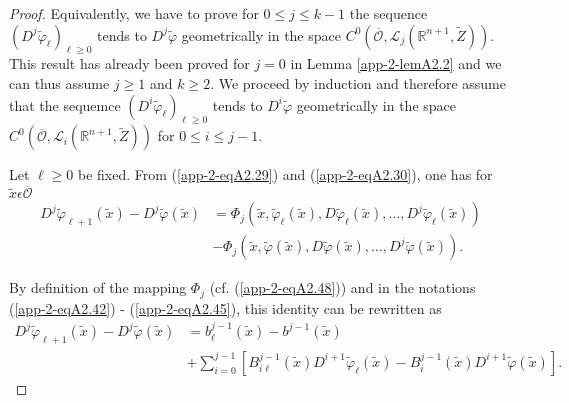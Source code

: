 \begin{proof}
Equivalently, we have to prove for $0 \leq j \leq k-1$ the sequence
$(D^{j}\widetilde{\varphi}_{\ell})_{\ell \geq 0}$ tends to
$D^{j}\widetilde{\varphi}$ geometrically in the space
$C^{0}(\overline{\mathscr{O}}, \mathscr{L}_{j}(\mathbb{R}^{n+1},
\widetilde{Z}))$. This result has already been proved for $j = 0$ in
Lemma \ref{app-2-lemA2.2} and we can thus assume $j \geq 1$ and $k \geq 2$. We
proceed by induction and therefore assume that the sequemce
$(D^{i}\widetilde{\varphi}_{\ell})_{\ell \geq 0}$ tends to
$D^{i}\widetilde{\varphi}$ geometrically in the space
$C^{0}(\overline{\mathscr{O}}, \mathscr{L}_{i}(\mathbb{R}^{n+1},
\widetilde{Z}))$ for $0 \leq i \leq j-1$.

Let $\ell \geq 0$ be fixed. From (\ref{app-2-eqA2.29}) and (\ref{app-2-eqA2.30}), one has for
$\widetilde{x} \epsilon \overline{\mathscr{O}}$
\begin{align*}
D^{j}\widetilde{\varphi}_{\ell + 1}(\widetilde{x}) -
D^{j}\widetilde{\varphi}(\widetilde{x}) &= \Phi_{j}(\widetilde{x},
\widetilde{\varphi}_{\ell} (\widetilde{x}),
D\widetilde{\varphi}_{\ell} (\widetilde{x}), \ldots,
D^{j}\widetilde{\varphi}_{\ell} (\widetilde{x}))\\ 
&- \Phi_{j}
(\widetilde{x}, \widetilde{\varphi}(\widetilde{x}),
D\widetilde{\varphi}(\widetilde{x}), \ldots,
D^{j}\widetilde{\varphi}(\widetilde{x})). 
\end{align*}

By definition of the mapping $\Phi_{j}$ (cf. (\ref{app-2-eqA2.48})) and in the
notations (\ref{app-2-eqA2.42}) - (\ref{app-2-eqA2.45}), this identity can be rewritten as
\begin{align*}
D^{j}\widetilde{\varphi}_{\ell + 1} (\widetilde{x}) -
D^{j}\widetilde{\varphi}(\widetilde{x}) &= b_{\ell}^{j-1}
(\widetilde{x}) - b^{j-1} (\widetilde{x})\\ 
&+ \sum\limits_{i=0}^{j-1}
\left[B_{i \ell}^{j-1} (\widetilde{x})
  D^{i+1}\widetilde{\varphi}_{\ell} (\widetilde{x}) -
  B_{i}^{j-1}(\widetilde{x}) D^{i+1}\widetilde{\varphi}(\widetilde{x})\right]. 
\end{align*}


\end{proof}
